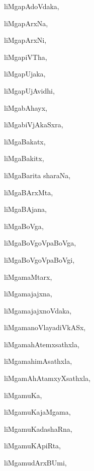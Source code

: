 \begin{multicols}{3}
{\noindent
{liMgapAdoVdaka}, \pageref{liMgapAdoVdaka}

\noindent
{liMgapArxNa}, \pageref{liMgapArxNa}

\noindent
{liMgapArxNi}, \pageref{liMgapArxNi}

\noindent
{liMgapiVTha}, \pageref{liMgapiVTha}

\noindent
{liMgapUjaka}, \pageref{liMgapUjaka}

\noindent
{liMgapUjAvidhi}, \pageref{liMgapUjAvidhi}

\noindent
{liMgabAhayx}, \pageref{liMgabAhayx}

\noindent
{liMgabiVjAkaSxra}, \pageref{liMgabiVjAkaSxra}

\noindent
{liMgaBakatx}, \pageref{liMgaBakatx}

\noindent
{liMgaBakitx}, \pageref{liMgaBakitx}

\noindent
{liMgaBarita sharaNa}, \pageref{liMgaBaritasharaNa}

\noindent
{liMgaBArxMta}, \pageref{liMgaBArxMta}

\noindent
{liMgaBAjana}, \pageref{liMgaBAjana}

\noindent
{liMgaBoVga}, \pageref{liMgaBoVga}

\noindent
{liMgaBoVgoVpaBoVga}, \pageref{liMgaBoVgoVpaBoVga}

\noindent
{liMgaBoVgoVpaBoVgi}, \pageref{liMgaBoVgoVpaBoVgi}

\noindent
{liMgamaMtarx}, \pageref{liMgamaMtarx}

\noindent
{liMgamajajxna}, \pageref{liMgamajajxna}

\noindent
{liMgamajajxnoVdaka}, \pageref{liMgamajajxnoVdaka}

\noindent
{liMgamanoVlayadiVkASx}, \pageref{liMgamanoVlayadiVkASx}

\noindent
{liMgamahAtemxsathxla}, \pageref{liMgamahAtemxsathxla}

\noindent
{liMgamahimAsathxla}, \pageref{liMgamahimAsathxla}

\noindent
{liMgamAhAtamxyXsathxla}, \pageref{liMgamAhAtamxyXsathxla}

\noindent
{liMgamuKa}, \pageref{liMgamuKa}

\noindent
{liMgamuKajaMgama}, \pageref{liMgamuKajaMgama}

\noindent
{liMgamuKadashaRna}, \pageref{liMgamuKadashaRna}

\noindent
{liMgamuKApiRta}, \pageref{liMgamuKApiRta}

\noindent
{liMgamudArxBUmi}, \pageref{liMgamudArxBUmi}

}
\end{multicols}

